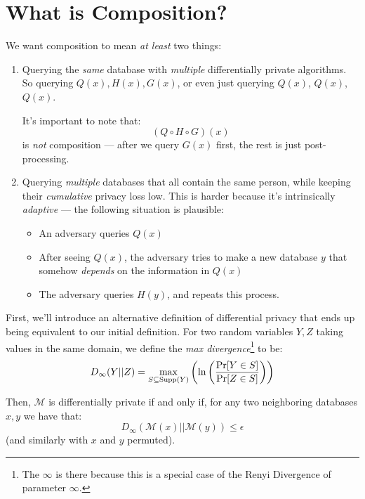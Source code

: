 \documentclass{article}
\theoremstyle{definition}
\begin{document}
\section{What is Composition?}
We want composition to mean \emph{at least} two things:
\begin{enumerate}
\item Querying the \emph{same} database with \emph{multiple} differentially private algorithms.
So querying $Q(x), H(x), G(x)$, or even just querying $Q(x)$, $Q(x)$, $Q(x)$.

It's important to note that:
\begin{equation}
(Q\circ H\circ G)(x)
\end{equation}
is \emph{not} composition --- after we query $G(x)$ first, the rest is just post-processing.
\item Querying \emph{multiple} databases that all contain the same person, while keeping their \emph{cumulative} privacy loss low.
This is harder because it's intrinsically \emph{adaptive} --- the following situation is plausible:
\begin{itemize}
\item An adversary queries $Q(x)$
\item After seeing $Q(x)$, the adversary tries to make a new database $y$ that somehow \emph{depends} on the information in $Q(x)$
\item The adversary queries $H(y)$, and repeats this process.
\end{itemize}
\end{enumerate}
First, we'll introduce an alternative definition of differential privacy that ends up being equivalent to our initial definition.
For two random variables $Y,Z$ taking values in the same domain, we define the \emph{max divergence}\footnote{The $\infty$ is there because this is a special case of the Renyi Divergence of parameter $\infty$.} to be:
\begin{equation}
D_\infty (Y||Z) = \max_{S\subseteq\text{Supp}(Y)}\pqty{\ln\pqty{\frac{\Pr[Y\in S]}{\Pr[Z\in S]}}}
\end{equation}

Then, $\mathcal{M}$ is differentially private if and only if, for any two neighboring databases $x,y$ we have that:
\begin{equation}
D_\infty(\mathcal{M}(x)||\mathcal{M}(y)) \leq \epsilon
\end{equation}
(and similarly with $x$ and $y$ permuted).
\end{document}
